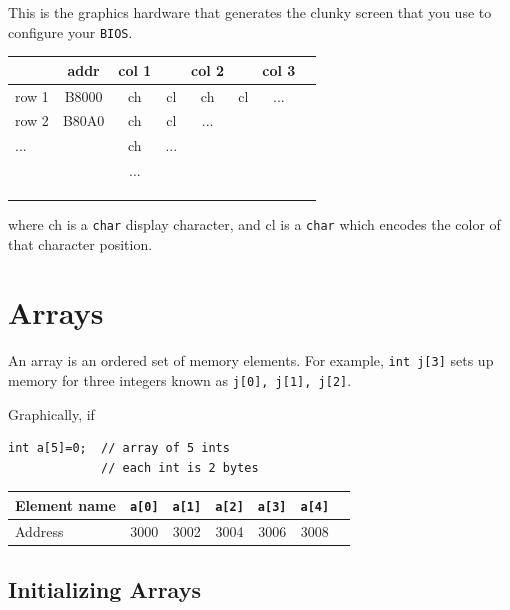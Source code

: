  This is the graphics hardware that generates	%
the clunky screen that you use to configure
your {\tt BIOS}.


\begin{tabular}{l|c|c|c|c|c|c|c}
\hline
      & addr & col 1 & &col 2 & &col 3  & \\ \hline
 row 1 &B8000    & ch &cl &ch &cl &...  \\ \hline
 row 2 &B80A0    & ch &cl &... & & \\ \hline
 ...   & &ch & ...& & & \\ \hline
       & &... & & & & \\ \hline
       & & & & & & \\ \hline
       & & & & & & \\ \hline
       & & & & & & \\ \hline
\end{tabular}

\noindent
where ch is a {\tt char} display character, and
cl is a {\tt char} which encodes the color of that
character position.


\section{Arrays}
An array is an ordered set of memory elements. For example,
{\tt int j[3]} sets up memory for three integers known as {\tt j[0], j[1], j[2]}.


Graphically, if
\begin{verbatim}
int a[5]=0;  // array of 5 ints
             // each int is 2 bytes
\end{verbatim}

\begin{tabular}{l|c|c|c|c|c|c|}
\hline
Element name & {\tt a[0]} & {\tt a[1]} & {\tt a[2]} & {\tt a[3]} & {\tt a[4]} \\ \hline
Address      & 3000 & 3002 & 3004 & 3006 & 3008 \\ \hline
\end{tabular}

\subsection{Initializing Arrays}


